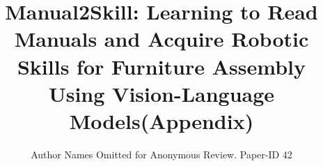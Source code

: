 \documentclass[conference]{IEEEtran}
\begin{document}
\title{Manual2Skill: Learning to Read Manuals and Acquire Robotic Skills for Furniture Assembly Using Vision-Language Models(Appendix)}
\author{Author Names Omitted for Anonymous Review. Paper-ID 42}

\IEEEpeerreviewmaketitle



\end{document}
